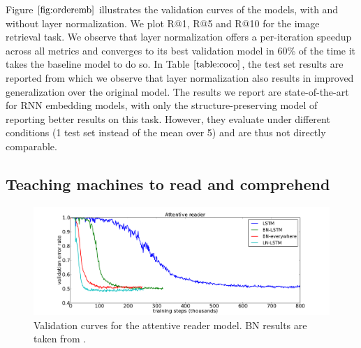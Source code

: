 \documentclass{article}
\begin{document}
Figure $\ref{fig:orderemb}$ illustrates the validation curves of the models, with and without layer normalization. We plot R@1, R@5 and R@10 for the image retrieval task. We observe that layer normalization offers a per-iteration speedup across all metrics and converges to its best validation model in 60\% of the time it takes the baseline model to do so. In Table $\ref{table:coco}$, the test set results are reported from which we observe that layer normalization also results in improved generalization over the original model. The results we report are state-of-the-art for RNN embedding models, with only the structure-preserving model of \citet{wang2015learning} reporting better results on this task. However, they evaluate under different conditions (1 test set instead of the mean over 5) and are thus not directly comparable.


\subsection{Teaching machines to read and comprehend}

\begin{figure}
  \centering
  \vspace{-0.3in}
  \includegraphics[width=1.0\columnwidth]{figures/dar}  
  \caption{Validation curves for the attentive reader model. BN results are taken from \citep{cooijmans2016recurrent}.
 \vspace{-0.15in} 
}
  \label{fig:attread}
  \vspace{-0.1in}
\end{figure}
\end{document}
